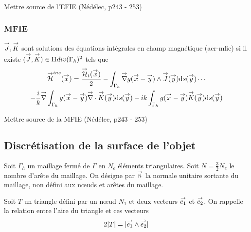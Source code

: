         \begin{REF}
          Mettre source de l'EFIE (Nédélec, p243 - 253)
        \end{REF}

      \subsubsection{MFIE}

        \begin{defn}
          \({\overset{\rightarrow}{J}},{\overset{\rightarrow}{K}}\) sont solutions des équations intégrales en champ magnétique (\gls{acr-mfie}) si il existe \(({\overset{\rightarrow}{J}},{\overset{\rightarrow}{K}}) \in \mathrm{H}_\mathrm{{}}{div}(\Gamma_h)^2\) tels que
          \begin{multline}
            \label{eq:form_int:MFIE}
            \vH^{inc}(\vx) =
            \frac{\vH_t(\vx)}{2}
              - \int_{\Gamma_h} \vgrad g(\vx - \vy) \pvect \vJ(\vy) \dd{s}(\vy) \cdots \\
            - \frac{i}{k} \vgrad \int_{\Gamma_h}  g(\vx - \vy)\vdiv\vK(\vy)\dd{s}(\vy)
              - ik \int_{\Gamma_h} g(\vx - \vy)\vK(\vy)\dd{s}(\vy)
          \end{multline}
        \end{defn}

        \begin{REF}
          Mettre source de la MFIE (Nédélec, p243 - 253)
        \end{REF}

  \subsection{Discrétisation de la surface de l'objet}

    Soit \(\Gamma_h\) un maillage fermé de \(\Gamma\) en \(N_e\) éléments triangulaires. Soit \(N=\frac{3}{2}N_e\) le nombre d'arête du maillage. On désigne par \({\overset{\rightarrow}{n}}\) la normale unitaire sortante du maillage, non défini aux nœuds et arêtes du maillage.

    Soit \(T\) un triangle défini par un nœud \(N_1\) et deux vecteurs \({\overset{\rightarrow}{e_1}}\) et \({\overset{\rightarrow}{e_2}}\). On rappelle la relation entre l'aire du triangle et ces vecteurs 
    \begin{equation}
      2|T| = |{\overset{\rightarrow}{e_1}}\wedge{\overset{\rightarrow}{e_2}}|
    \end{equation}

